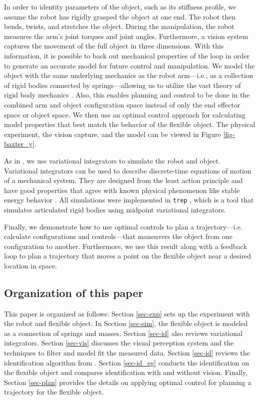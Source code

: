 \documentclass[runningheads,a4paper]{llncs}
\begin{document}
In order to identity parameters of the object, such as its stiffness profile, we assume the robot has rigidly grasped the object at one end. The robot then bends, twists, and stretches the object.  During the manipulation, the robot measures the arm's joint torques and joint angles.  Furthermore, a vision system captures the movement of the full object in three dimensions.  With this information, it is possible to back out mechanical properties of the loop in order to generate an accurate model for future control and manipulation. We model the object with the same underlying mechanics as the robot arm---i.e., as a collection of rigid bodies connected by springs---allowing us to utilize the vast theory of rigid body mechanics \cite{murray_li_sastry}. Also, this enables planning and control to be done in the combined arm and object configuration space instead of only the end effector space or object space.  We then use an optimal control approach for calculating model properties that best match the behavior of the flexible object. The physical experiment, the vision capture, and the model can be viewed in Figure \ref{fig-baxter_y}.

As in \cite{caldwell_coleman_correll_iros}, we use variational integrators to simulate the robot and object.  Variational integrators can be used to describe discrete-time equations of motion of a mechanical system.  They are designed from the least action principle and have good properties that agree with known physical phenomenon like stable energy behavior \cite{pekarek_murphey}. All simulations were implemented in \texttt{trep} \cite{johnson_murphey_scalable,johnson_murphey_linearization}, which is a tool that simulates articulated rigid bodies using midpoint variational integrators.

Finally, we demonstrate how to use optimal controls to plan a trajectory---i.e. calculate configurations and controls---that maneuvers the object from one configuration to another. Furthermore, we use this result along with a feedback loop to plan a trajectory that moves a point on the flexible object near a desired location in space.

\subsection{Organization of this paper}
This paper is organized as follows: Section \ref{sec-exp} sets up the experiment with the robot and flexible object. In Section \ref{sec-sim}, the flexible object is modeled as a connection of springs and masses. Section \ref{sec-id} also reviews variational integrators. Section \ref{sec-vis} discusses the visual perception system and the techniques to filter and model fit the measured data. Section \ref{sec-id} reviews the identification algorithm from \cite{caldwell_coleman_correll_iros}. Section \ref{sec-id_eg} conducts the identification on the flexible object and compares identification with and without vision. Finally, Section \ref{sec-plan} provides the details on applying optimal control for planning a trajectory for the flexible object.
\end{document}
